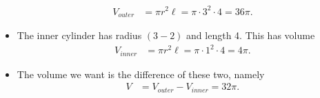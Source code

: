 \begin{eg}
\begin{itemize}
\begin{align*}
  V_{outer} &= \pi r^2 \ell = \pi \cdot 3^2 \cdot 4 = 36\pi.
\end{align*}
 \item The inner cylinder has radius $(3-2)$ and length 4. This has volume
\begin{align*}
  V_{inner} &= \pi r^2 \ell = \pi \cdot 1^2 \cdot 4 = 4\pi.
\end{align*}
\item The volume we want is the difference of these two, namely
\begin{align*}
  V &= V_{outer} - V_{inner} = 32\pi.
\end{align*}
\end{itemize}

\end{eg}

